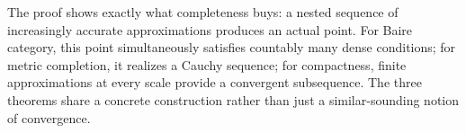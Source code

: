 The proof shows exactly what completeness buys: a nested sequence of increasingly accurate approximations produces an actual point. For Baire category, this point simultaneously satisfies countably many dense conditions; for metric completion, it realizes a Cauchy sequence; for compactness, finite approximations at every scale provide a convergent subsequence. The three theorems share a concrete construction rather than just a similar-sounding notion of convergence.
